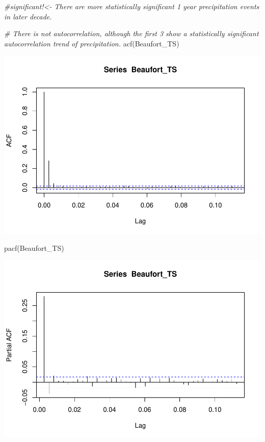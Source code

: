 \documentclass[
  12pt,
]{article}
\newenvironment{Shaded}{\begin{snugshade}}{\end{snugshade}}
\newcommand{\CommentTok}[1]{\textcolor[rgb]{0.56,0.35,0.01}{\textit{#1}}}
\newcommand{\FunctionTok}[1]{\textcolor[rgb]{0.00,0.00,0.00}{#1}}
\newcommand{\NormalTok}[1]{#1}
\begin{document}
\begin{Shaded}
\begin{Highlighting}[]
\CommentTok{\#significant!\textless{}{-} There are more statistically significant 1 year precipitation events in later decade. }
\end{Highlighting}
\end{Shaded}

\begin{Shaded}
\begin{Highlighting}[]
\CommentTok{\# There is not autocorrelation, although the first 3 show a statistically significant autocorrelation trend of precipitation.}
\FunctionTok{acf}\NormalTok{(Beaufort\_TS) }
\end{Highlighting}
\end{Shaded}

\includegraphics{Project_Template_TLK_files/figure-latex/unnamed-chunk-2-1.pdf}

\begin{Shaded}
\begin{Highlighting}[]
\FunctionTok{pacf}\NormalTok{(Beaufort\_TS) }
\end{Highlighting}
\end{Shaded}

\includegraphics{Project_Template_TLK_files/figure-latex/unnamed-chunk-2-2.pdf}
\end{document}
